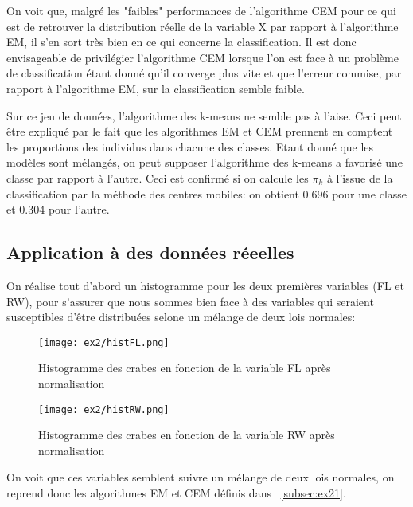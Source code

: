\documentclass{article}
\begin{document}
\begin{multicols}{2}
On voit que, malgré les "faibles" performances de l'algorithme CEM pour ce qui
est de retrouver la distribution réelle de la variable X par rapport à
l'algorithme EM, il s'en sort très bien en ce qui concerne la classification.
Il est donc envisageable de privilégier l'algorithme CEM lorsque l'on est face à
un problème de classification étant donné qu'il converge plus vite et que
l'erreur commise, par rapport à l'algorithme EM, sur la classification semble
faible.

Sur ce jeu de données, l'algorithme des k-means ne semble pas à l'aise. Ceci
peut être expliqué par le fait que les algorithmes EM et CEM prennent en
comptent les proportions des individus dans chacune des classes. Etant donné que
les modèles sont mélangés, on peut supposer l'algorithme des k-means a favorisé
une classe par rapport à l'autre. Ceci est confirmé si on calcule les $\pi_k$ à
l'issue de la classification par la méthode des centres mobiles: on obtient
0.696 pour une classe et 0.304 pour l'autre.

\subsection{Application à des données réeelles}\label{subsec:ex22}

On réalise tout d'abord un histogramme pour les deux premières variables
(FL et RW), pour s'assurer que nous sommes bien face à des variables qui
seraient susceptibles d'être distribuées selone un mélange de deux lois
normales:

\begin{figure}[H]
\begin{center}
    \texttt{[image: ex2/histFL.png]}
    \centering
    \captionsetup{justification=centering}
    \caption{\label{fig:histFL}Histogramme des crabes en fonction de la variable FL après normalisation}
\end{center}
\end{figure}

\begin{figure}[H]
\begin{center}
    \texttt{[image: ex2/histRW.png]}
    \centering
    \captionsetup{justification=centering}
    \caption{\label{fig:histRW}Histogramme des crabes en fonction de la variable RW après normalisation}
\end{center}
\end{figure}

On voit que ces variables semblent suivre un mélange de deux lois normales, on
reprend donc les algorithmes EM et CEM définis dans ~\ref{subsec:ex21}.


\end{multicols}
\end{document}
